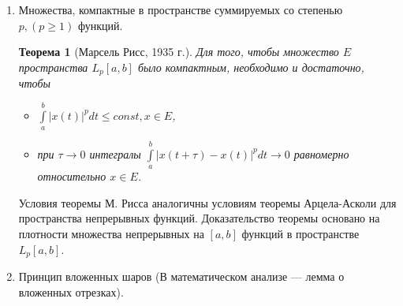 \documentclass[12pt,a4paper,titlepage,oneside]{book}
\newcommand{\overbar}[1]{\mkern 1.5mu\overline{\mkern-1.5mu#1\mkern-1.5mu}\mkern 1.5mu}
\theoremstyle{definition}
\theoremstyle{plain}
\newtheorem*{theorem}{Теорема}
\theoremstyle{remark}
\theoremstyle{remark}
\theoremstyle{remark}
\theoremstyle{remark}
\theoremstyle{plain}
\theoremstyle{plain}
\begin{document}
\begin{enumerate}
\begin{proof}
	Покажем, что компактное множество $H_{\varepsilon}$ образует в $E$ $\varepsilon$-сеть. Для любой функции $x\in E$ построим ломаную $\overbar{x}(t)$, $\overbar{x} \in H_{\varepsilon}$. Так как $x(t)$ непрерывна, то на отрезке $[t_k, t_{k+1}]$ она достигает своего максимального значения $M_k$ и своего минимального значения $m_k$: $m_k \leq x(t) \leq M_k, t \in [t_k, t_{k+1}]$. В этих же пределах лежат и значения линейной функции $\overbar{x}(t)$. Ясно, что $|x(t)-\overbar{x}(t)|\leq M_k-m_k, t \in [t_k, t_{k+1}]$.
	
	В силу выбора значения $\delta$ величины $M_k-m_k < \varepsilon$. Тогда и $\rho(x, \overbar{x} < \varepsilon$. Согласна следствию теоремы Хаусдорфа, множество $E$ компактно в $C[a, b]$.
	
	$\underbar {Необходимость}$ Свойства функций из компактного множества $E$, указанные в теореме, сразу следуют из существования в $E$ $\underbar {конечной}$ $\varepsilon$-сети непрерывных на $[a, b]$ функций $x_1(t), x_2(t),...,x_N(t)$.	

\end{proof}

	\item Множества, компактные в пространстве суммируемых со степенью $p, (p \geq 1)$ функций.

\begin{theorem} [Марсель Рисс, 1935 г.]
Для того, чтобы множество $E$  пространства $L_p[a, b]$ было компактным, необходимо и достаточно, чтобы

\begin{itemize}

	\item $\int\limits_a^b |x(t)|^p dt \leq const, x \in E$,

	\item при $\tau \to 0$ интегралы $\int\limits_a^b |x(t+\tau)-x(t)|^p dt \to 0$ равномерно относительно $x \in E$.

\end{itemize}

\end{theorem}

Условия теоремы М. Рисса аналогичны условиям теоремы Арцела-Асколи для пространства непрерывных функций. Доказательство теоремы основано на плотности множества непрерывных на $[a, b]$ функций в пространстве $L_p [a, b]$.

	\item Принцип вложенных шаров (В математическом анализе --- лемма о вложенных отрезках).


\end{enumerate}
\end{document}
